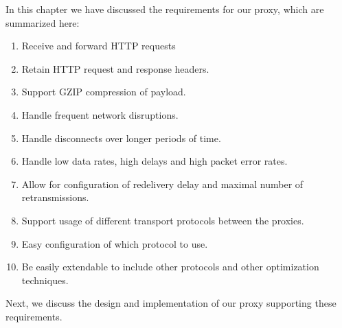 In this chapter we have discussed the requirements for our proxy, which are
summarized here:

\begin{enumerate}
    \item Receive and forward HTTP requests
    \item Retain HTTP request and response headers.
    \item Support GZIP compression of payload.
    \item Handle frequent network disruptions.
    \item Handle disconnects over longer periods of time.
    \item Handle low data rates, high delays and high packet error rates.
    \item Allow for configuration of redelivery delay and maximal number of retransmissions.
    \item Support usage of different transport protocols between the proxies.
    \item Easy configuration of which protocol to use.
    \item Be easily extendable to include other protocols and other optimization techniques.
\end{enumerate}

Next, we discuss the design and implementation of our proxy supporting these
requirements.
